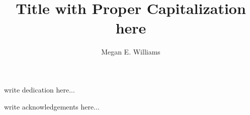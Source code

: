 \documentclass{ucbthesis}
\begin{document}
\linenumbers %


\title{Title with Proper Capitalization here}
\author{Megan E. Williams}

\maketitle


\begin{frontmatter}

\begin{dedication}
\null\vfil
\begin{center}
write dedication here...
\end{center}
\vfil\null
\end{dedication}

\tableofcontents
\clearpage
\listoffigures
\clearpage
\listoftables

\begin{acknowledgements}
write acknowledgements here...

\end{acknowledgements}

\end{frontmatter}

\pagestyle{headings}  %

%





%

%

%


\end{document}
